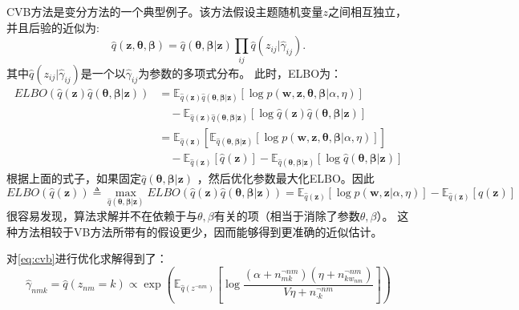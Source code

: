 
CVB方法是变分方法的一个典型例子。该方法假设主题随机变量$z$之间相互独立，并且后验的近似为:
\begin{equation}
\hat{q}(\mathbf{z, \theta, \beta}) = \hat{q}(\mathbf{\theta, \beta | z}) \prod_{ij} \hat{q}(z_{ij}| \hat{\gamma}_{ij}).
\end{equation}
其中$ \hat{q}(z_{ij}| \hat{\gamma}_{ij})$是一个以$\hat{\gamma}_{ij}$为参数的多项式分布。
此时，ELBO为：
\begin{align*}
ELBO( \hat{q}(\mathbf{z})\hat{q}(\mathbf{\theta, \beta | z }) )
	&= \mathbb{E}_{\hat{q}(\mathbf{z})\hat{q}(\mathbf{\theta, \beta | z })}
[ \log p(\mathbf{w, z, \theta, \beta} | \alpha, \eta)] \\
 & \quad - \mathbb{E}_{\hat{q}(\mathbf{z})\hat{q}(\mathbf{\theta, \beta | z })}
[ \log \hat{q}(\mathbf{z}) \hat{q}(\mathbf{\theta, \beta | z}) ] \\
& = \mathbb{E}_{\hat{q}(\mathbf{z})}[ \mathbb{E}_{\hat{q}(\mathbf{\theta, \beta | z })}
[ \log p(\mathbf{w, z, \theta, \beta} | \alpha, \eta)] ]  \\
& \quad - \mathbb{E}_{\hat{q}(\mathbf{z})}[ \hat{q}(\mathbf{z}) ] -  \mathbb{E}_{\hat{q}(\mathbf{\theta, \beta | z })} [ \log \hat{q}(\mathbf{\theta, \beta | z}) ]
\end{align*}
根据上面的式子，如果固定$\hat{q}(\mathbf{\theta, \beta | z})$ 
，然后优化参数最大化ELBO。因此
\begin{equation} \label{eq:cvb}
ELBO(\hat{q}(\mathbf{z})) \triangleq \max_{\hat{q}(\mathbf{\theta, \beta| z })} { 
ELBO \left( \hat{q}(\mathbf{z})\hat{q}(\mathbf{\theta, \beta | z }) \right) }
= \mathbb{E}_{\hat{q}(\mathbf{z})} 
[ \log p(\mathbf{w, z} | \alpha, \eta)]  
 - \mathbb{E}_{\hat{q}(\mathbf{z})}[ \hat{q}(\mathbf{z}) ]
\end{equation}
很容易发现，算法求解并不在依赖于与$\theta, \beta$有关的项（相当于消除了参数$\theta, \beta$）。
这种方法相较于VB方法所带有的假设更少，因而能够得到更准确的近似估计。

对\ref{eq:cvb}进行优化求解得到了：
\begin{equation}
\label{eq:cvb_gamma}
\hat{\gamma}_{nmk} = \hat{q}(z_{nm} = k ) \propto \exp \left(\mathbb{E}_{\hat{q}(z^{\neg nm})} \left[\log \dfrac{(\alpha + n_{mk}^{\neg nm})
(\eta + n_{kw_{nm}}^{\neg nm})}{V\eta + n_{\cdot k}^{\neg nm}}\right]\right)
\end{equation}


